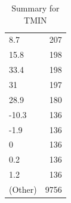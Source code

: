 \begin{table}[ht]
\begin{tabular}{lr}
  8.7 & 207 \\ 
  15.8 & 198 \\ 
  33.4 & 198 \\ 
  31 & 197 \\ 
  28.9 & 180 \\ 
  -10.3 & 136 \\ 
  -1.9 & 136 \\ 
  0 & 136 \\ 
  0.2 & 136 \\ 
  1.2 & 136 \\ 
  (Other) & 9756 \\ 
   \hline
\end{tabular}
\caption{Summary for TMIN} 
\label{tab: TMIN}
\end{table}
